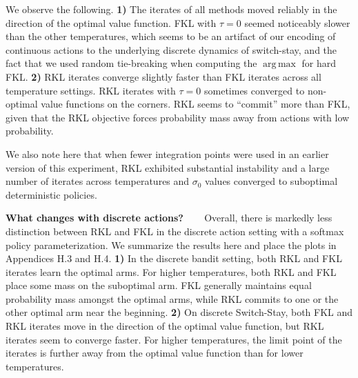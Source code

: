 \documentclass{article}
\DeclareMathOperator*{\argmax}{arg\,max}
\newcommand{\myparagraph}[1]{\textbf{#1} \ \ \ }
\begin{document}



We observe the following.
\textbf{1)} The iterates of all methods moved reliably in the direction of the optimal value function. FKL with $\tau = 0$ seemed noticeably slower than the other temperatures, which seems to be an artifact of our encoding of continuous actions to the underlying discrete dynamics of switch-stay, and the fact that we used random tie-breaking when computing the $\argmax$ for hard FKL. 
\textbf{2)} RKL iterates converge slightly faster than FKL iterates across all temperature settings. RKL iterates with $\tau = 0$ sometimes converged to non-optimal value functions on the corners. RKL seems to ``commit'' more than FKL, given that the RKL objective forces probability mass away from actions with low probability. 

We also note here that when fewer integration points were used in an earlier version of this experiment, RKL exhibited substantial instability and a large number of iterates across temperatures and $\sigma_0$ values converged to suboptimal deterministic policies. 

 
\myparagraph{What changes with discrete actions?}
Overall, there is markedly less distinction between RKL and FKL in the discrete action setting with a softmax policy parameterization. We summarize the results here and place the plots in Appendices H.3 and H.4.
\textbf{1)} In the discrete bandit setting, both RKL and FKL iterates learn the optimal arms. For higher temperatures, both RKL and FKL place some mass on the suboptimal arm. FKL generally maintains equal probability mass amongst the optimal arms, while RKL commits to one or the other optimal arm near the beginning. 
\textbf{2)} On discrete Switch-Stay, both FKL and RKL iterates move in the direction of the optimal value function, but RKL iterates seem to converge faster. For higher temperatures, the limit point of the iterates is further away from the optimal value function than for lower temperatures. 
\end{document}
